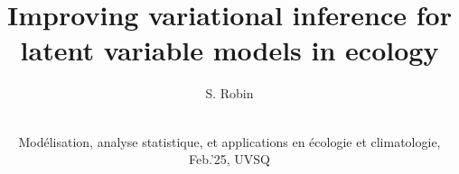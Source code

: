 \documentclass[8pt]{beamer}
\begin{document}

\title[Improving variational inference]{Improving variational inference for latent variable models in ecology}

\author[S. Robin]{S. Robin}


\date[Feb.'25, UVSQ]{
  \vspace{0.1\textheight} \\
  Mod\'elisation, analyse statistique, et applications en \'ecologie et climatologie, Feb.'25, UVSQ
  }

\maketitle

\end{document}
